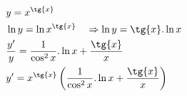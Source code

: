 \begin{ex}
\begin{align}
&y=x^{\tg{x}}\nonumber\\
&\ln{y}=\ln{x}^{\tg{x}}\quad\Rightarrow \ln{y}=\tg{x}.\ln{x}\nonumber\\
&\frac{y'}{y}=\frac{1}{\cos^2{x}}.\ln{x}+\frac{\tg{x}}{x}\nonumber\\
&y'=x^{\tg{x}}\left(\frac{1}{\cos^2{x}}.\ln{x}+\frac{\tg{x}}{x}\right)\nonumber
\end{align}
\end{ex}
